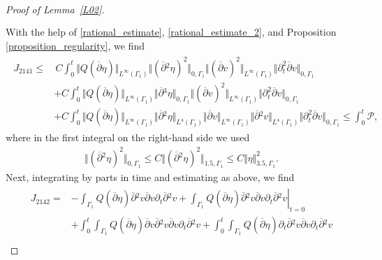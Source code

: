 \documentclass[10pt,reqno]{amsart}
\theoremstyle{plain}
\theoremstyle{definition}
\numberwithin{equation}{section}
\newcommand{\ccP}{\mathscr{P}}
\newcommand{\Ga}{\Gamma}
\newcommand{\norm}[1]{\Vert#1\Vert}
\begin{document}
\begin{proof}[Proof of Lemma~\ref{L02}]
\begin{align}
\begin{split}
\end{split}
\nonumber
\end{align}
With the help of  \eqref{rational_estimate}, \eqref{rational_estimate_2}, and Proposition
\ref{proposition_regularity}, we find
\begin{align}
\begin{split}
J_{2141} \leq & \,
C\int_0^t 
\norm{Q(\overline{\partial} \eta)}_{L^\infty(\Ga_1)} 
\norm{ (\overline{\partial}{}^2 \eta)^2}_{0,\Ga_1}
\norm{(\overline{\partial} v)^2}_{L^\infty(\Ga_1)} 
\norm{\partial^2_t \overline{\partial} v}_{0,\Ga_1}
\\
&
+
C\int_0^t 
\norm{Q(\overline{\partial} \eta)}_{L^\infty(\Ga_1)} 
\norm{ \overline{\partial}{}^3 \eta}_{0,\Ga_1}
\norm{(\overline{\partial} v)^2}_{L^\infty(\Ga_1)} 
\norm{\partial^2_t \overline{\partial} v}_{0,\Ga_1}
\\
&
+
C\int_0^t 
\norm{Q(\overline{\partial} \eta)}_{L^\infty(\Ga_1)} 
\norm{ \overline{\partial}{}^2 \eta}_{L^4(\Ga_1)}
\norm{\overline{\partial} v}_{L^\infty(\Ga_1)} 
\norm{\overline{\partial}{}^2 v}_{L^4(\Ga_1)} 
\norm{\partial^2_t \overline{\partial} v}_{0,\Ga_1}
\leq
\int_{0}^{t}\ccP,
\end{split}
\nonumber
\end{align}
where in the first integral on the right-hand side we used
\begin{gather}
\norm{ (\overline{\partial}{}^2 \eta)^2}_{0,\Ga_1} \leq
C\norm{ (\overline{\partial}{}^2 \eta)^2}_{1.5,\Ga_1}
\leq C\norm{ \eta}^2_{3.5,\Ga_1}.
\nonumber
\end{gather}
Next, integrating by parts in time and estimating as above, we find
\begin{align}
\begin{split}
 J_{2142} = & 
 - \int_{\Ga_1}  Q(\overline{\partial} \eta)
\overline{\partial}{}^2 v
\overline{\partial} v  \partial_t \overline{\partial}{}^2 v + 
\left.
 \int_{\Ga_1}  Q(\overline{\partial} \eta)
\overline{\partial}{}^2 v
\overline{\partial} v  \partial_t \overline{\partial}{}^2 v \right|_{t=0}
\\
&
+
\int_0^t \int_{\Ga_1}  Q(\overline{\partial} \eta)
\overline{\partial} v
\overline{\partial}{}^2 v
\overline{\partial} v  \partial_t \overline{\partial}{}^2 v
+ 
\int_0^t \int_{\Ga_1}  Q(\overline{\partial} \eta)
\partial_t \overline{\partial}{}^2 v
\overline{\partial} v  \partial_t \overline{\partial}{}^2 v
\\

\end{split}
\end{align}
\end{proof}
\end{document}

